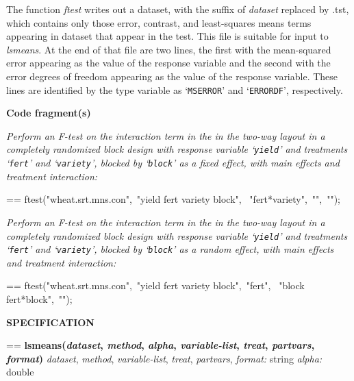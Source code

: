 \documentclass{book}
\makeatletter
\newcommand\Texinfocommandstyletextvar[1]{{\normalfont{}\textsl{#1}}}%
\newenvironment{Texinfopreformatted}{%
  \par\GNUTobeylines\obeyspaces\frenchspacing\parskip=\z@\parindent=\z@}{}
{\catcode`\^^M=13 \gdef\GNUTobeylines{\catcode`\^^M=13 \def^^M{\null\par}}}
\newenvironment{Texinfoindented}{\begin{list}{}{}\item\relax}{\end{list}}
\renewcommand{\_}{\Texinfounderscore\discretionary{}{}{}}
\makeatother
\begin{document}
The function \Texinfocommandstyletextvar{ftest} writes out a dataset,
with the suffix of \Texinfocommandstyletextvar{dataset} replaced by .tst,
which contains only those error, contrast, and least-squares means terms
appearing in dataset that appear in the test.
This file is suitable for input to \Texinfocommandstyletextvar{lsmeans}.
%
%
At the end of that file are two lines, the first
with the mean-squared error appearing as the value of the response variable
and the second with the error degrees of freedom
appearing as the value of the response variable.
These lines are identified by the \_type\_ variable as
`\texttt{MSERROR}' and `\texttt{ERRORDF}', respectively.

\noindent{}\textbf{Code fragment(s)}

\emph{Perform an F-test on the interaction term in the
in the two-way layout in a completely randomized block design with
response variable `\texttt{yield}' and treatments `\texttt{fert}' and
`\texttt{variety}', blocked by `\texttt{block}' as a fixed effect, with main effects
and treatment interaction:}
\begin{Texinfoindented}
\begin{Texinfopreformatted}%
\ttfamily ftest("wheat.srt.mns.con",\ "yield fert variety block",
\                                    "fert*variety",\ "",\ "");
\end{Texinfopreformatted}
\end{Texinfoindented}

\emph{Perform an F-test on the interaction term in the
in the two-way layout in a completely randomized block design with
response variable `\texttt{yield}' and treatments `\texttt{fert}' and
`\texttt{variety}', blocked by `\texttt{block}' as a random effect, with main effects
and treatment interaction:}
\begin{Texinfoindented}
\begin{Texinfopreformatted}%
\ttfamily ftest("wheat.srt.mns.con",\ "yield fert variety block",\ "fert",
\                                    "block fert*block",\ "");
\end{Texinfopreformatted}
\end{Texinfoindented}

\noindent{}\textbf{SPECIFICATION}
\begin{Texinfoindented}
\begin{Texinfopreformatted}%
\textbf{lsmeans(\Texinfocommandstyletextvar{dataset}, \Texinfocommandstyletextvar{method}, \Texinfocommandstyletextvar{alpha}, \Texinfocommandstyletextvar{variable-list}, \Texinfocommandstyletextvar{treat}, \Texinfocommandstyletextvar{partvars}, \Texinfocommandstyletextvar{format})}
\Texinfocommandstyletextvar{dataset}, \Texinfocommandstyletextvar{method}, \Texinfocommandstyletextvar{variable-list}, \Texinfocommandstyletextvar{treat}, \Texinfocommandstyletextvar{partvars}, \Texinfocommandstyletextvar{format:} string
\Texinfocommandstyletextvar{alpha:} double
\end{Texinfopreformatted}
\end{Texinfoindented}
%
%
\end{document}
